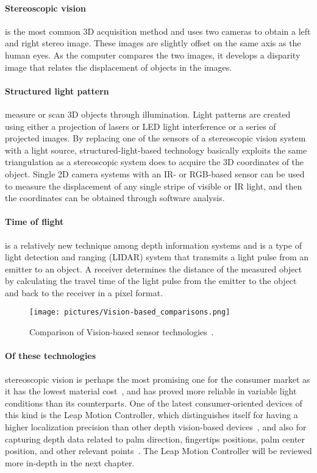 \paragraph{Stereoscopic vision}is the most common 3D acquisition method and uses two cameras to obtain a left and right stereo image. 
These images are slightly offset on the same axis as the human eyes. As the computer compares the two images, 
it develops a disparity image that relates the displacement of objects in the images.

\paragraph{Structured light pattern}measure or scan 3D objects through illumination. Light patterns are created using either a projection of lasers or LED light 
interference or a series of projected images. 
By replacing one of the sensors of a stereoscopic vision system with a light source, structured-light-based technology basically exploits the same triangulation as a 
stereoscopic system does to acquire the 3D coordinates of the object. 
Single 2D camera systems with an IR- or RGB-based sensor can be used to measure the displacement of any single stripe of visible or IR light, 
and then the coordinates can be obtained through software analysis.

\paragraph{Time of flight}is a relatively new technique among depth information systems
and is a type of light detection and ranging (LIDAR) system that transmits a light pulse from an emitter to an object. 
A receiver determines the distance of the measured object by calculating the travel time of the light pulse from the emitter to the object and back to the receiver 
in a pixel format.

\begin{figure}%
	\texttt{[image: pictures/Vision-based\_comparisons.png]}
	\caption{Comparison of Vision-based sensor technologies~\citep{Ko2012}.}
	\label{fig:VBComparisions}
\end{figure} 

\paragraph{Of these technologies} stereoscopic vision is perhaps the most promising one for the consumer market as it has the lowest material cost~\citep{Ko2012}, 
and has proved more reliable in variable light conditions than its counterparts. 
One of the latest consumer-oriented devices of this kind is the Leap Motion Controller, 
which distinguishes itself for having a higher localization precision than other depth vision-based devices~\citep{Weichert2013}, 
and also for capturing depth data related to palm direction, fingertips positions, palm center position, and other relevant points~\citep{Wei2016}. 
The Leap Motion Controller will be reviewed more in-depth in the next chapter. 

